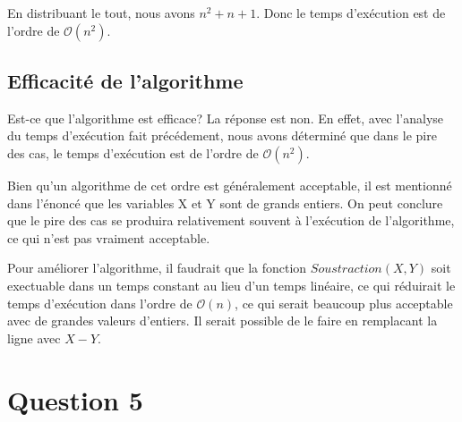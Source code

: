 \documentclass[12pt]{article}
\begin{document}
    \noindent En distribuant le tout, nous avons \( n ^ 2 + n + 1 \). Donc le
    temps d'exécution est de l'ordre de \( \mathcal{O}(n^2) \).

  \subsection*{Efficacité de l'algorithme}
   	Est-ce que l'algorithme est efficace? La réponse est non. En effet, avec
   	l'analyse du temps d'exécution fait précédement, nous avons déterminé
   	que dans le pire des cas, le temps d'exécution est de l'ordre
   	de \( \mathcal{O}(n^2) \). \newline

   	\noindent Bien qu'un algorithme de cet ordre est généralement acceptable,
   	il est mentionné dans l'énoncé que les variables X et Y sont de grands
   	entiers. On peut conclure que le pire des cas se produira relativement
   	souvent à l'exécution de l'algorithme, ce qui n'est pas vraiment
    acceptable. \newline

    \noindent Pour améliorer l'algorithme, il faudrait que la fonction
    \( Soustraction(X, Y) \) soit exectuable dans un temps constant au lieu d'un
    temps linéaire, ce qui réduirait le temps d'exécution dans l'ordre de
    \( \mathcal{O}(n) \), ce qui serait beaucoup plus acceptable avec de grandes
    valeurs d'entiers. Il serait possible de le faire en remplacant la ligne
    avec \( X - Y \).

  \newpage

  \section*{Question 5}

  \newpage
\end{document}
